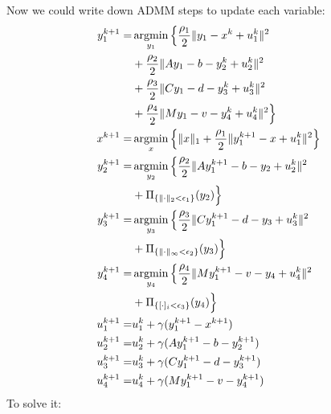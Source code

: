 \documentclass[annual]{acmsiggraph}
\begin{document}
Now we could write down ADMM steps to update each variable: 
\begin{align}
y_1^{k+1}=&\operatornamewithlimits{argmin}\limits_{y_1} \Big\{\frac{\rho_1}{2}\|y_1-x^k+u_1^k\|^2\notag\\
&+\frac{\rho_2}{2}\|Ay_1-b-y_2^k+u_2^k\|^2\notag\\
&+\frac{\rho_3}{2}\|Cy_1-d-y_3^k+u_3^k\|^2\notag\\
&+\frac{\rho_4}{2}\|My_1-v-y_4^k+u_4^k\|^2 \Big\} \\
x^{k+1}=&\operatornamewithlimits{argmin}\limits_{x} \Big\{\|x\|_1+\frac{\rho_1}{2}\|y_1^{k+1}-x+u_1^k\|^2\Big\}\\
y_2^{k+1}=&\operatornamewithlimits{argmin}\limits_{y_2} \Big\{\frac{\rho_2}{2}\|Ay_1^{k+1}-b-y_2+u_2^k\|^2\notag\\&+\Pi_{\{\|\cdot\|_2<\epsilon_1\}}(y_2)\Big\}\\
y_3^{k+1}=&\operatornamewithlimits{argmin}\limits_{y_3} \Big\{\frac{\rho_3}{2}\|Cy_1^{k+1}-d-y_3+u_3^k\|^2\notag\\&+\Pi_{\{\|\cdot\|_{\infty}<\epsilon_2\}}(y_3)\Big\}\\
y_4^{k+1}=&\operatornamewithlimits{argmin}\limits_{y_4} \Big\{\frac{\rho_4}{2}\|My_1^{k+1}-v-y_4+u_4^k\|^2\notag\\&+\Pi_{\{[\cdot]_i<\epsilon_3\}}(y_4)\Big\}\\
u_1^{k+1}=&u_1^k+\gamma(y_1^{k+1}-x^{k+1})\\
u_2^{k+1}=&u_2^k+\gamma(Ay_1^{k+1}-b-y_2^{k+1})\\
u_3^{k+1}=&u_3^k+\gamma(Cy_1^{k+1}-d-y_3^{k+1})\\
u_4^{k+1}=&u_4^k+\gamma(My_1^{k+1}-v-y_4^{k+1})\\
\end{align}
To solve it:
\end{document}
